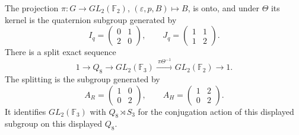 \begin{theorem}
\label{esn:thm:triality-q8}
The projection \(\pi:G\to GL_2(\mathbb F_2)\),
\((\varepsilon,p,B)\mapsto B\), is onto, and under \(\Theta\) its
kernel is the quaternion subgroup generated by
\[
 I_q=\begin{pmatrix}0&1\\2&0\end{pmatrix},
 \qquad J_q=\begin{pmatrix}1&1\\1&2\end{pmatrix}.
\]
There is a split exact sequence
\[
 1\longrightarrow Q_8\longrightarrow GL_2(\mathbb F_3)
 \xrightarrow{\ \pi\Theta^{-1}\ }GL_2(\mathbb F_2)
 \longrightarrow1.
\]
The splitting is the subgroup generated by
\[
 A_R=\begin{pmatrix}1&0\\0&2\end{pmatrix},
 \qquad A_H=\begin{pmatrix}1&2\\0&2\end{pmatrix}.
\]
It identifies \(GL_2(\mathbb F_3)\) with \(Q_8\rtimes S_3\) for the
conjugation action of this displayed subgroup on this displayed \(Q_8\).
\end{theorem}

